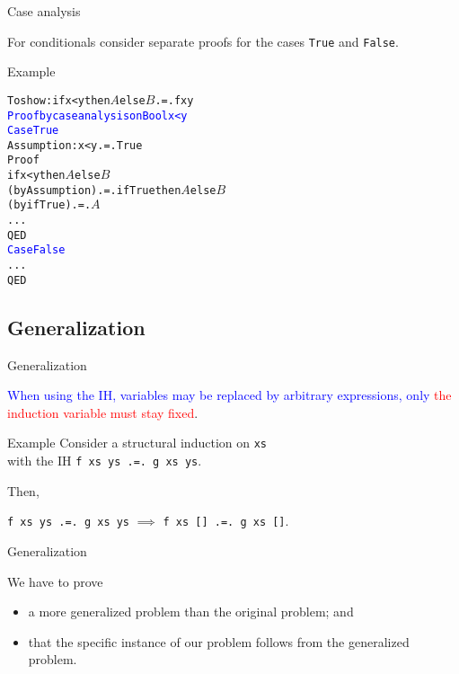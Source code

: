 \documentclass{beamer}
\def\code#1{\texttt{\frenchspacing#1}}
\begin{document}
\begin{frame}[fragile]{Case analysis}

For conditionals consider separate proofs for the cases \code{True} and \code{False}.

\pause

\begin{exampleblock}{Example}
\small\begin{alltt}
To show: if x < y then \(A\) else \(B\) .=. f x y\pause
\textcolor{blue}{Proof by case analysis on Bool x < y}
\textcolor{blue}{Case True}
  Assumption: x < y .=. True
  Proof
                        if x < y then \(A\) else \(B\)\pause
    (by Assumption) .=. if True then \(A\) else \(B\)\pause
    (by ifTrue)     .=. \(A\)
    ...
  QED\pause
\textcolor{blue}{Case False}
  ...
QED
\end{alltt}\normalsize
\end{exampleblock}

\end{frame}

\subsection{Generalization}

\begin{frame}{Generalization}

\begin{center}
    \textcolor{blue}{When using the IH, variables may be replaced by arbitrary expressions, only} \textcolor{red}{the induction variable must stay fixed}.
\end{center}

\pause

\vspace{0.5cm}
\begin{exampleblock}{Example}
Consider a structural induction on \code{xs} \\
with the IH \code{f xs ys .=. g xs ys}. \par\pause
Then,

\begin{center}
    \code{f xs ys .=. g xs ys} $\implies$ \code{f xs [] .=. g xs []}.
\end{center}
\end{exampleblock}

\end{frame}

\begin{frame}{Generalization}

We have to prove\pause
\begin{itemize}
    \item a more generalized problem than the original problem; and\pause
    \item that the specific instance of our problem follows from the generalized problem.
\end{itemize}

\end{frame}
\end{document}
